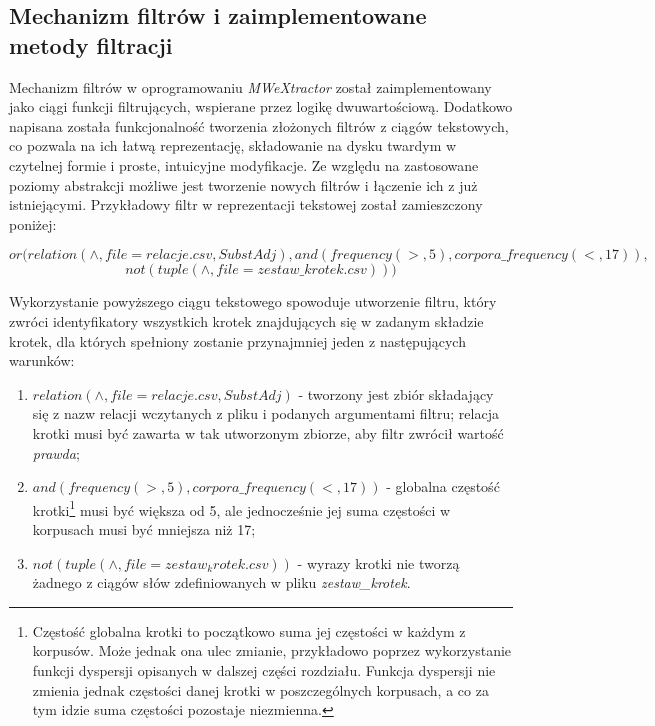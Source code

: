 \subsection{Mechanizm filtrów i zaimplementowane metody filtracji}
Mechanizm filtrów w oprogramowaniu \emph{MWeXtractor} został zaimplementowany jako ciągi funkcji filtrujących, wspierane przez logikę dwuwartościową.
Dodatkowo napisana została funkcjonalność tworzenia złożonych filtrów z ciągów tekstowych, co pozwala na ich łatwą reprezentację, składowanie na dysku twardym w czytelnej formie i proste, intuicyjne modyfikacje.
Ze względu na zastosowane poziomy abstrakcji możliwe jest tworzenie nowych filtrów i łączenie ich z już istniejącymi. 
Przykładowy filtr w reprezentacji tekstowej został zamieszczony poniżej:

$$ or(relation(\wedge,file=relacje.csv,SubstAdj),and(frequency(>,5),corpora\_frequency(<,17)), $$
$$not(tuple(\wedge,file=zestaw\_krotek.csv))) $$

Wykorzystanie powyższego ciągu tekstowego spowoduje utworzenie filtru, który zwróci identyfikatory wszystkich krotek znajdujących się w zadanym składzie krotek, dla których spełniony zostanie przynajmniej jeden z następujących warunków:
\begin{enumerate}
 \item $ relation(\wedge,file=relacje.csv,SubstAdj) $ - tworzony jest zbiór składający się z nazw relacji wczytanych z pliku i podanych argumentami filtru; relacja krotki musi być zawarta w tak utworzonym zbiorze, aby filtr zwrócił wartość \emph{prawda};
 \item $ and(frequency(>,5),corpora\_frequency(<,17)) $ - globalna częstość krotki\footnote{Częstość globalna krotki to początkowo suma jej częstości w każdym z korpusów. Może jednak ona ulec zmianie, przykładowo poprzez wykorzystanie funkcji dyspersji opisanych w dalszej części rozdziału. Funkcja dyspersji nie zmienia jednak częstości danej krotki w poszczególnych korpusach, a co za tym idzie suma częstości pozostaje niezmienna.} musi być większa od 5, ale jednocześnie jej suma częstości w korpusach musi być mniejsza niż 17;
 \item $ not(tuple(\wedge,file=zestaw_krotek.csv)) $ - wyrazy krotki nie tworzą żadnego z ciągów słów zdefiniowanych w pliku \emph{zestaw\_krotek}.
\end{enumerate}

